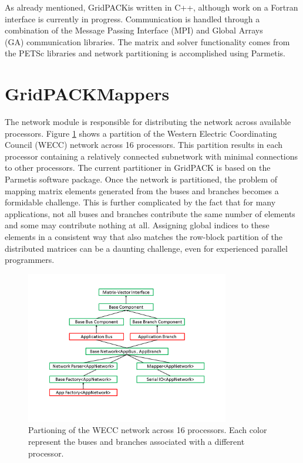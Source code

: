 \documentclass[preprint]{acm_proc_article-sp}
\begin{document}
As already mentioned, GridPACK\texttrademark is written in C++, although work
on a Fortran interface is currently in progress. Communication is handled
through a combination of the Message Passing Interface (MPI)\cite{MPI1} and
Global Arrays\\
(GA)\cite{GA} communication libraries. The matrix and solver
functionality comes from the PETSc\cite{PETSC} libraries and network partitioning
is accomplished using Parmetis\cite{PARMETIS}.

\section{GridPACK\texttrademark Mappers}
The network module is responsible for distributing the network across available
processors. Figure \ref{wecc} shows a partition of the Western Electric
Coordinating Council (WECC) network across 16 processors. This partition results
in each processor containing a relatively connected subnetwork with minimal
connections to other processors. The current partitioner in GridPACK\texttrademark
is based on the Parmetis software package. Once the network is partitioned, the
problem of mapping matrix elements generated from the buses and branches becomes
a formidable challenge. This is further complicated by the fact that for many
applications, not all buses and branches contribute the same number of elements
and some may contribute nothing at all. Assigning global indices to these
elements in a consistent way that also matches the row-block partition of the
distributed matrices can be a daunting challenge, even for experienced parallel
programmers.
\begin{figure}
\centering
\includegraphics[width=3.5in,keepaspectratio=true]{./Fig2}
\caption{\label{wecc} Partioning of the WECC network across 16 processors. Each
color represent the buses and branches associated with a different processor.
}
\end{figure}
\end{document}
